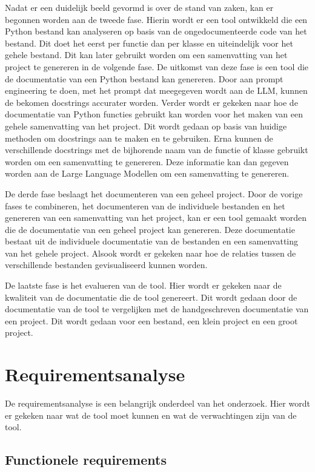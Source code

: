 Nadat er een duidelijk beeld gevormd is over de stand van zaken, kan er begonnen worden aan de tweede fase.
Hierin wordt er een tool ontwikkeld die een Python bestand kan analyseren op basis van de ongedocumenteerde code van het bestand.
Dit doet het eerst per functie dan per klasse en uiteindelijk voor het gehele bestand. Dit kan later gebruikt worden om een samenvatting van het project te genereren in de volgende fase.
De uitkomst van deze fase is een tool die de documentatie van een Python bestand kan genereren. 
Door aan prompt engineering te doen, met het prompt dat meegegeven wordt aan de LLM, kunnen de bekomen docstrings accurater worden.
Verder wordt er gekeken naar hoe de documentatie van Python functies gebruikt kan worden voor het maken van een gehele samenvatting van het project.
Dit wordt gedaan op basis van huidige methoden om docstrings aan te maken en te gebruiken. 
Erna kunnen de verschillende docstrings met de bijhorende naam van de functie of klasse gebruikt worden om een samenvatting te genereren.
Deze informatie kan dan gegeven worden aan de Large Language Modellen om een samenvatting te genereren.

De derde fase beslaagt het documenteren van een geheel project.
Door de vorige fases te combineren, het documenteren van de individuele bestanden en het genereren van een samenvatting van het project, kan er een tool gemaakt worden die de documentatie van een geheel project kan genereren.
Deze documentatie bestaat uit de individuele documentatie van de bestanden en een samenvatting van het gehele project. 
Alsook wordt er gekeken naar hoe de relaties tussen de verschillende bestanden gevisualiseerd kunnen worden.

De laatste fase is het evalueren van de tool.
Hier wordt er gekeken naar de kwaliteit van de documentatie die de tool genereert.
Dit wordt gedaan door de documentatie van de tool te vergelijken met de handgeschreven documentatie van een project.
Dit wordt gedaan voor een bestand, een klein project en een groot project.

\section{Requirementsanalyse}
\label{sec:requirements-analyse}
De requirementsanalyse is een belangrijk onderdeel van het onderzoek. 
Hier wordt er gekeken naar wat de tool moet kunnen en wat de verwachtingen zijn van de tool.

\subsection{Functionele requirements}
\label{sec:functionele-requirements}

